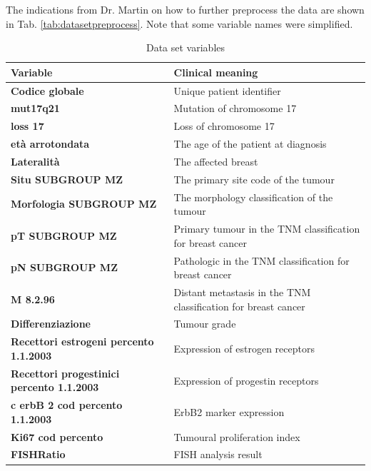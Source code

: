 The indications from Dr. Martin on how to further preprocess the data are shown in Tab. \ref{tab:datasetpreprocess}.
Note that some variable names were simplified.

\begin{table}[htbp]
\caption{Data set variables}
\begin{tabularx}{\textwidth}{@{} l Y @{}}
\toprule 
\textbf{Variable} & Clinical meaning \\
\midrule 
\textbf{Codice globale} & Unique patient identifier \\
\textbf{mut17q21} & Mutation of chromosome 17 \\
\textbf{loss 17} & Loss of chromosome 17 \\
\textbf{et\`a arrotondata} & The age of the patient at diagnosis \\
\textbf{Lateralit\`a} & The affected breast \\
\textbf{Situ SUBGROUP MZ} & The primary site code of the tumour \\
\textbf{Morfologia SUBGROUP MZ} & The morphology classification of the tumour \\
\textbf{pT SUBGROUP MZ} & Primary tumour in the TNM classification for breast cancer \\
\textbf{pN SUBGROUP MZ} & Pathologic in the TNM classification for breast cancer \\
\textbf{M 8.2.96} & Distant metastasis in the TNM classification for breast cancer \\
\textbf{Differenziazione} & Tumour grade \\
\textbf{Recettori estrogeni percento 1.1.2003} & Expression of estrogen receptors \\
\textbf{Recettori progestinici percento 1.1.2003} & Expression of progestin receptors \\
\textbf{c erbB 2  cod percento 1.1.2003} & ErbB2 marker expression \\
\textbf{Ki67 cod percento} & Tumoural proliferation index \\
\textbf{FISHRatio} & FISH analysis result \\
\bottomrule
\end{tabularx}
\label{tab:datasetvariables}
\end{table}

